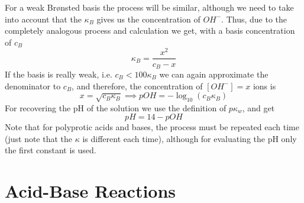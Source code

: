 \documentclass[../qm.tex]{subfiles}
\begin{document}
\begin{mtd}
\begin{equation*}
	\end{equation*}
	For a weak Brønsted basis the process will be similar, although we need to take into account that the $\kappa_B$ gives us the concentration of $OH^-$. Thus, due to the completely analogous process and calculation we get, with a basis concentration of $c_B$
	\begin{equation}
		\kappa_B=\frac{x^2}{c_B-x}
		\label{eq:basiskb.chem}
	\end{equation}
	If the basis is really weak, i.e. $c_B<100\kappa_B$ we can again approximate the denominator to $c_B$, and therefore, the concentration of $\left[ OH^- \right]=x$ ions is
	\begin{equation*}
		x=\sqrt{c_B\kappa_B}\implies pOH=-\log_{10}\left( c_B\kappa_B \right)
	\end{equation*}
	For recovering the pH of the solution we use the definition of $p\kappa_w$, and get
	\begin{equation*}
		pH=14-pOH
	\end{equation*}
	Note that for polyprotic acids and bases, the process must be repeated each time (just note that the $\kappa$ is different each time), although for evaluating the pH only the first constant is used.
\end{mtd}
\section{Acid-Base Reactions}
\end{document}
